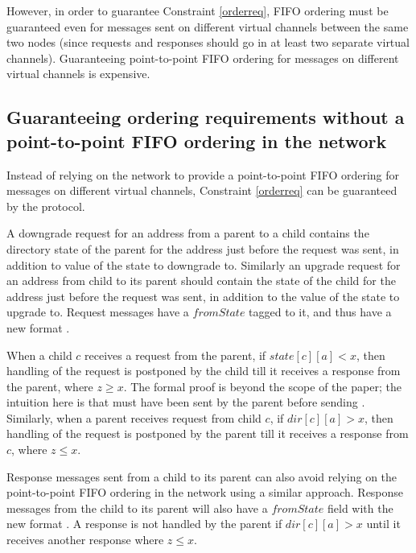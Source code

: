 However, in order to guarantee Constraint \ref{orderreq}, FIFO ordering must be
guaranteed even for messages sent on different virtual channels between the
same two nodes (since requests and responses should go in at least two separate
virtual channels). Guaranteeing point-to-point FIFO ordering for messages on
different virtual channels is expensive.

\subsection{Guaranteeing ordering requirements without a point-to-point FIFO
ordering in the network}
\label{sec:nofifoorder}

Instead of relying on the network to provide a point-to-point FIFO ordering for
messages on different virtual channels, Constraint \ref{orderreq} can be
guaranteed by the protocol.

A downgrade request for an address from a parent to a child contains the
directory state of the parent for the address just before the request was sent,
in addition to value of the state to downgrade to. Similarly an upgrade request
for an address from child to its parent should contain the state of the child
for the address just before the request was sent, in addition to the value of
the state to upgrade to. Request messages have a $fromState$ tagged to it, and
thus have a new format .

When a child $c$ receives a request  from the parent, if
$state[c][a] < x$, then handling of the request is postponed by the child till
it receives a response  from the parent, where $z \ge x$.
The formal proof is beyond the scope of the paper; the intuition here is that
 must have been sent by the parent before sending
. Similarly, when a parent receives request
 from child $c$, if $dir[c][a] > x$, then handling of the
request is postponed by the parent till it receives a response
 from $c$, where $z \le x$.

Response messages sent from a child to its parent can also avoid relying on the
point-to-point FIFO ordering in the network using a similar approach. Response
messages from the child to its parent will also have a $fromState$ field with
the new format . A response
 is not handled by the parent if $dir[c][a] > x$ until it
receives another response  where $z \le x$.

